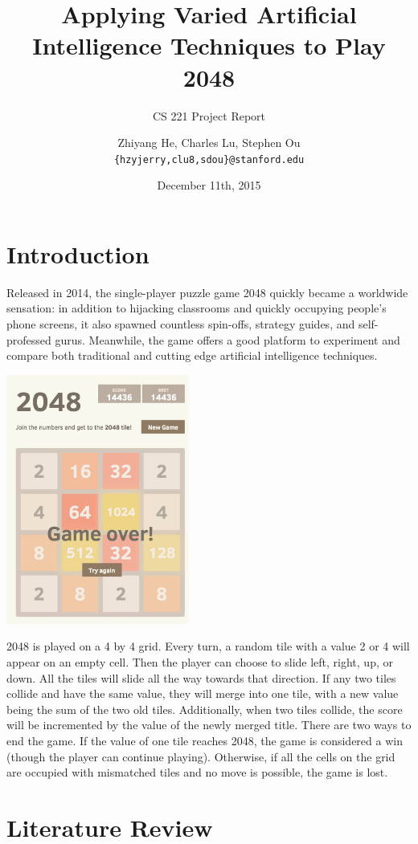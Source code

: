\documentclass[9pt,twocolumn]{article}
\title{Applying Varied Artificial Intelligence Techniques to Play 2048}
\subtitle{CS 221 Project Report}
\author{Zhiyang He, Charles Lu, Stephen Ou \\ \texttt{\{hzyjerry,clu8,sdou\}@stanford.edu}}
\date{December 11th, 2015}
\begin{document}
\maketitle

\section{Introduction}

Released in 2014, the single-player puzzle game 2048 quickly became a worldwide sensation: in addition to hijacking classrooms and quickly occupying people's phone screens, it also spawned countless spin-offs, strategy guides, and self-professed gurus. Meanwhile, the game offers a good platform to experiment and compare both traditional and cutting edge artificial intelligence techniques.

\includegraphics[width=60mm]{2048_screenshot2.jpg}

2048 is played on a 4 by 4 grid. Every turn, a random tile with a value 2 or 4 will appear on an empty cell. Then the player can choose to slide left, right, up, or down. All the tiles will slide all the way towards that direction. If any two tiles collide and have the same value, they will merge into one tile, with a new value being the sum of the two old tiles. Additionally, when two tiles collide, the score will be incremented by the value of the newly merged title. There are two ways to end the game. If the value of one tile reaches 2048, the game is considered a win (though the player can continue playing). Otherwise, if all the cells on the grid are occupied with mismatched tiles and no move is possible, the game is lost.

\section{Literature Review}
\end{document}
